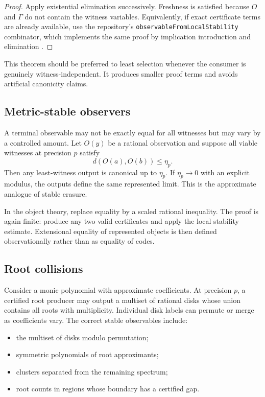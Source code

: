 \begin{proof}
Apply existential elimination successively.  Freshness is satisfied because \(O\) and \(\Gamma\) do not contain the witness variables.  Equivalently, if exact certificate terms are already available, use the repository's \texttt{observableFromLocalStability} combinator, which implements the same proof by implication introduction and elimination \cite{repo-observable}.
\end{proof}

This theorem should be preferred to least selection whenever the consumer is genuinely witness-independent.  It produces smaller proof terms and avoids artificial canonicity claims.

\subsection{Metric-stable observers}

A terminal observable may not be exactly equal for all witnesses but may vary by a controlled amount.  Let \(O(y)\) be a rational observation and suppose all viable witnesses at precision \(p\) satisfy
\[
 d(O(a),O(b))\le\eta_p.
\]
Then any least-witness output is canonical up to \(\eta_p\).  If \(\eta_p\to0\) with an explicit modulus, the outputs define the same represented limit.  This is the approximate analogue of stable erasure.

In the object theory, replace equality by a scaled rational inequality.  The proof is again finite: produce any two valid certificates and apply the local stability estimate.  Extensional equality of represented objects is then defined observationally rather than as equality of codes.

\subsection{Root collisions}

Consider a monic polynomial with approximate coefficients.  At precision \(p\), a certified root producer may output a multiset of rational disks whose union contains all roots with multiplicity.  Individual disk labels can permute or merge as coefficients vary.  The correct stable observables include:

\begin{itemize}
\item the multiset of disks modulo permutation;
\item symmetric polynomials of root approximants;
\item clusters separated from the remaining spectrum;
\item root counts in regions whose boundary has a certified gap.
\end{itemize}

